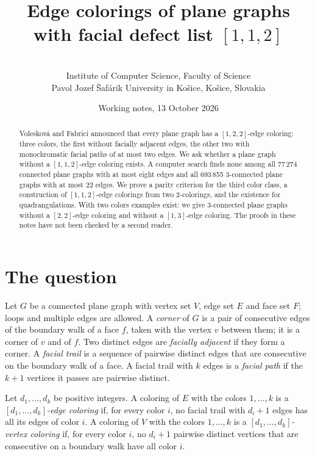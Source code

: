 \documentclass[11pt,a4paper]{article}
\title{Edge colorings of plane graphs\\ with facial defect list $[1,1,2]$}
\author{\PaperAuthor\\[0.5ex]
  {\normalsize Institute of Computer Science, Faculty of Science}\\
  {\normalsize Pavol Jozef Šafárik University in Košice, Košice, Slovakia}}
\date{Working notes, 13 October 2026}
\begin{document}
\maketitle

\begin{abstract}
Volesková and Fabrici announced that every plane graph has a $[1,2,2]$-edge coloring: three colors, the first without facially adjacent edges, the other two with monochromatic facial paths of at most two edges.
We ask whether a plane graph without a $[1,1,2]$-edge coloring exists.
A computer search finds none among all 77\,274 connected plane graphs with at most eight edges and all 693\,855 3-connected plane graphs with at most 22 edges.
We prove a parity criterion for the third color class, a construction of $[1,1,2]$-edge colorings from two 2-colorings, and the existence for quadrangulations.
With two colors examples exist: we give 3-connected plane graphs without a $[2,2]$-edge coloring and without a $[1,3]$-edge coloring.
The proofs in these notes have not been checked by a second reader.
\end{abstract}

\section{The question}
\label{sec:question}

Let $G$ be a connected plane graph with vertex set $V$, edge set $E$ and face set $F$; loops and multiple edges are allowed.
A \emph{corner} of $G$ is a pair of consecutive edges of the boundary walk of a face $f$, taken with the vertex $v$ between them; it is a corner of $v$ and of $f$.
Two distinct edges are \emph{facially adjacent} if they form a corner.
A \emph{facial trail} is a sequence of pairwise distinct edges that are consecutive on the boundary walk of a face.
A facial trail with $k$ edges is a \emph{facial path} if the $k+1$ vertices it passes are pairwise distinct.

\begin{definition}
\label{def:defect}
Let $d_1,\dots,d_k$ be positive integers.
A coloring of $E$ with the colors $1,\dots,k$ is a \emph{$[d_1,\dots,d_k]$-edge coloring} if, for every color $i$, no facial trail with $d_i+1$ edges has all its edges of color $i$.
A coloring of $V$ with the colors $1,\dots,k$ is a \emph{$[d_1,\dots,d_k]$-vertex coloring} if, for every color $i$, no $d_i+1$ pairwise distinct vertices that are consecutive on a boundary walk have all color $i$.
\end{definition}
\end{document}
